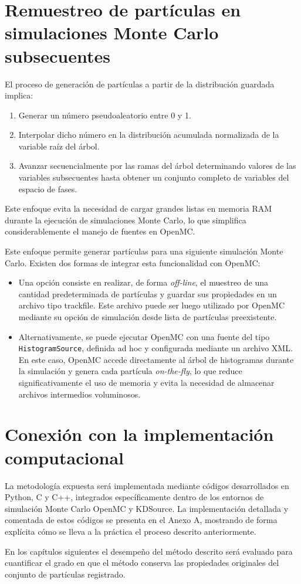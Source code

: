 \section{Remuestreo de partículas en simulaciones Monte Carlo subsecuentes}
El proceso de generación de partículas a partir de la distribución guardada implica:
\begin{enumerate}
    \item Generar un número pseudoaleatorio entre 0 y 1.
    \item Interpolar dicho número en la distribución acumulada normalizada de la variable raíz del árbol.
    \item Avanzar secuencialmente por las ramas del árbol determinando valores de las variables subsecuentes hasta obtener un conjunto completo de variables del espacio de fases.
\end{enumerate}

Este enfoque evita la necesidad de cargar grandes listas en memoria RAM durante la ejecución de simulaciones Monte Carlo, lo que simplifica considerablemente el manejo de fuentes en OpenMC.

Este enfoque permite generar partículas para una siguiente simulación Monte Carlo. Existen dos formas de integrar esta funcionalidad con OpenMC:

\begin{itemize}
    \item Una opción consiste en realizar, de forma \emph{off-line}, el muestreo de una cantidad predeterminada de partículas y guardar sus propiedades en un archivo tipo trackfile. Este archivo puede ser luego utilizado por OpenMC mediante su opción de simulación desde lista de partículas preexistente.
    
    \item Alternativamente, se puede ejecutar OpenMC con una fuente del tipo \texttt{HistogramSource}, definida ad hoc y configurada mediante un archivo XML. En este caso, OpenMC accede directamente al árbol de histogramas durante la simulación y genera cada partícula \emph{on-the-fly}, lo que reduce significativamente el uso de memoria y evita la necesidad de almacenar archivos intermedios voluminosos.
\end{itemize}

\section{Conexión con la implementación computacional}
La metodología expuesta será implementada mediante códigos desarrollados en Python, C y C++, integrados específicamente dentro de los entornos de simulación Monte Carlo OpenMC y KDSource. La implementación detallada y comentada de estos códigos se presenta en el Anexo A, mostrando de forma explícita cómo se lleva a la práctica el proceso descrito anteriormente.

En los capítulos siguientes el desempeño del método descrito será evaluado para cuantificar el grado en que el método conserva las propiedades originales del conjunto de partículas registrado.
